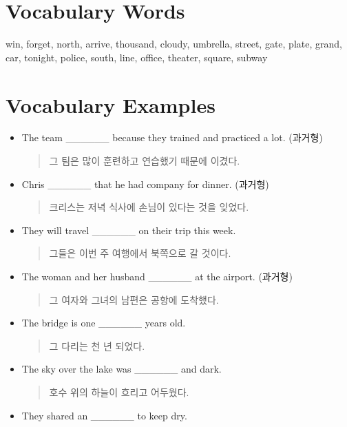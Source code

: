 \documentclass{article}
\begin{document}
\newpage

\section*{Vocabulary Words}
\begin{addmargin}[1em]{1em}
win, forget, north, arrive, thousand, cloudy, umbrella, street, gate, plate, grand, car, tonight, police, south, line, office, theater, square, subway
\end{addmargin}

\section*{Vocabulary Examples}
\begin{addmargin}[1em]{1em}
\begin{itemize}
    \item The team \_\_\_\_\_\_ because they trained and practiced a lot. (과거형)
    \begin{quote}
    그 팀은 많이 훈련하고 연습했기 때문에 이겼다.
    \end{quote}
    \item Chris \_\_\_\_\_\_ that he had company for dinner. (과거형)
    \begin{quote}
    크리스는 저녁 식사에 손님이 있다는 것을 잊었다.
    \end{quote}
    \item They will travel \_\_\_\_\_\_ on their trip this week.
    \begin{quote}
    그들은 이번 주 여행에서 북쪽으로 갈 것이다.
    \end{quote}
    \item The woman and her husband \_\_\_\_\_\_ at the airport. (과거형)
    \begin{quote}
    그 여자와 그녀의 남편은 공항에 도착했다.
    \end{quote}
    \item The bridge is one \_\_\_\_\_\_ years old.
    \begin{quote}
    그 다리는 천 년 되었다.
    \end{quote}
    \item The sky over the lake was \_\_\_\_\_\_ and dark.
    \begin{quote}
    호수 위의 하늘이 흐리고 어두웠다.
    \end{quote}
    \item They shared an \_\_\_\_\_\_ to keep dry.
    \begin{quote}

\end{quote}
\end{itemize}
\end{addmargin}
\end{document}
